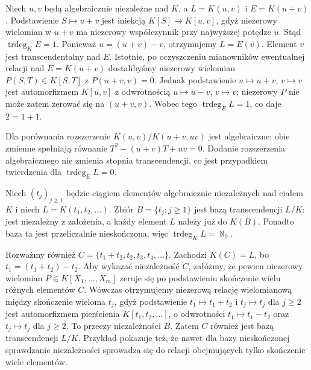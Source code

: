 \begin{przyklad}
\label{aa:prz:transcendence-tower-rational}
Niech $u,v$ będą algebraicznie niezależne nad $K$,
a $L=K(u,v)$ i $E=K(u+v)$. Podstawienie
$S\mapsto u+v$ jest iniekcją $K[S]\to K[u,v]$,
gdyż niezerowy wielomian w $u+v$ ma niezerowy
współczynnik przy najwyższej potędze $u$.
Stąd $\operatorname{trdeg}_K E=1$.
Ponieważ $u=(u+v)-v$, otrzymujemy $L=E(v)$.
Element $v$ jest transcendentalny nad $E$. Istotnie,
po oczyszczeniu mianowników ewentualnej relacji
nad $E=K(u+v)$ dostalibyśmy niezerowy wielomian
$P(S,T)\in K[S,T]$ z $P(u+v,v)=0$.
Jednak podstawienie $u\mapsto u+v$, $v\mapsto v$
jest automorfizmem $K[u,v]$ z odwrotnością
$u\mapsto u-v$, $v\mapsto v$; niezerowy $P$
nie może zatem zerować się na $(u+v,v)$.
Wobec tego $\operatorname{trdeg}_E L=1$, co daje $2=1+1$.

Dla porównania rozszerzenie $K(u,v)/K(u+v,uv)$
jest algebraiczne: obie zmienne spełniają równanie
$T^2-(u+v)T+uv=0$. Dodanie rozszerzenia algebraicznego
nie zmienia stopnia transcendencji, co jest przypadkiem
twierdzenia dla $\operatorname{trdeg}_E L=0$.
\end{przyklad}

\begin{przyklad}
\label{aa:prz:transcendence-infinite}
Niech $(t_j)_{j\ge1}$ będzie ciągiem elementów algebraicznie
niezależnych nad ciałem $K$ i niech
$L=K(t_1,t_2,\ldots)$. Zbiór $B=\{t_j:j\ge1\}$
jest bazą transcendencji $L/K$: jest niezależny z założenia,
a każdy element $L$ należy już do $K(B)$.
Ponadto baza ta jest przeliczalnie nieskończona,
więc $\operatorname{trdeg}_K L=\aleph_0$.

Rozważmy również
$C=\{t_1+t_2,t_2,t_3,t_4,\ldots\}$.
Zachodzi $K(C)=L$, bo $t_1=(t_1+t_2)-t_2$.
Aby wykazać niezależność $C$, załóżmy, że pewien niezerowy
wielomian $P\in K[X_1,\ldots,X_m]$ zeruje się po
podstawieniu skończenie wielu różnych elementów $C$.
Wówczas otrzymujemy niezerową relację wielomianową między
skończenie wieloma $t_j$, gdyż podstawienie
$t_1\mapsto t_1+t_2$ i $t_j\mapsto t_j$ dla $j\ge2$
jest automorfizmem pierścienia
$K[t_1,t_2,\ldots]$, o odwrotności
$t_1\mapsto t_1-t_2$ oraz $t_j\mapsto t_j$ dla $j\ge2$.
To przeczy niezależności $B$. Zatem $C$ również jest
bazą transcendencji $L/K$.
Przykład pokazuje też, że nawet dla bazy nieskończonej
sprawdzanie niezależności sprowadza się do relacji
obejmujących tylko skończenie wiele elementów.
\end{przyklad}

